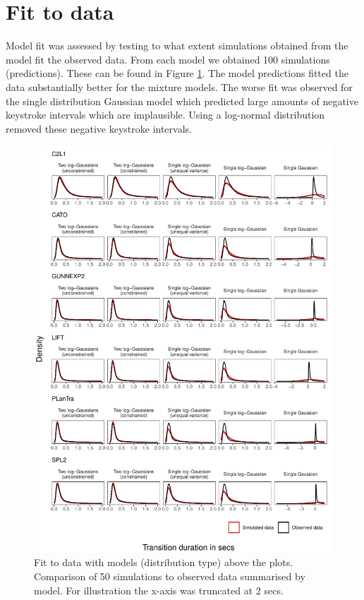 \documentclass[
  man,floatsintext]{apa7}
\begin{document}
\newpage

\hypertarget{fit-to-data}{%
\section{Fit to data}\label{fit-to-data}}

Model fit was assessed by testing to what extent simulations obtained from the model fit the observed data. From each model we obtained 100 simulations (predictions). These can be found in Figure \ref{fig:prediction}. The model predictions fitted the data substantially better for the mixture models. The worse fit was observed for the single distribution Gaussian model which predicted large amounts of negative keystroke intervals which are implausible. Using a log-normal distribution removed these negative keystroke intervals.

\begin{figure}

{\centering \includegraphics{figures/fitplots} 

}

\caption{Fit to data with models (distribution type) above the plots. Comparison of 50 simulations to observed data summarised by model. For illustration the x-axis was truncated at 2 secs.}\label{fig:prediction}
\end{figure}
\end{document}
